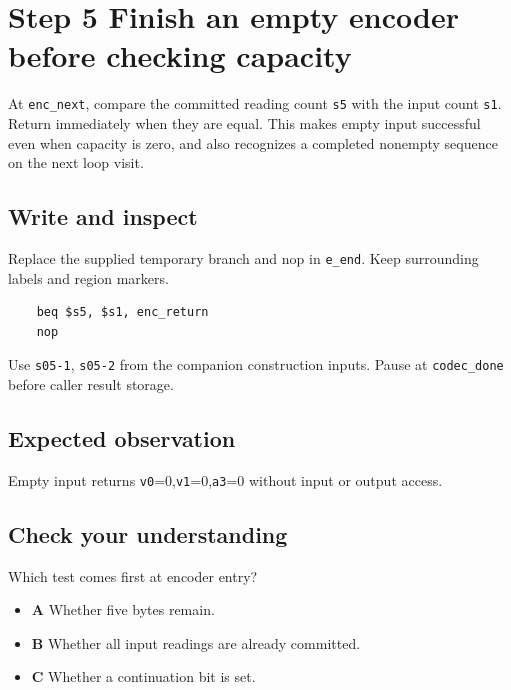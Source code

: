 \section{Step 5 Finish an empty encoder before checking capacity}\label{delta-s05}

At \texttt{enc\_next}, compare the committed reading count \texttt{s5} with the input count \texttt{s1}. Return immediately when they are equal. This makes empty input successful even when capacity is zero, and also recognizes a completed nonempty sequence on the next loop visit.

\subsection{Write and inspect}
Replace the supplied temporary branch and nop in \texttt{e\_end}. Keep surrounding labels and region markers.

\begin{verbatim}
    beq $s5, $s1, enc_return
    nop
\end{verbatim}
Use \texttt{s05-1}, \texttt{s05-2} from the companion construction inputs. Pause at \texttt{codec\_done} before caller result storage.

\subsection{Expected observation}
Empty input returns \texttt{v0}=0,\texttt{v1}=0,\texttt{a3}=0 without input or output access.

\subsection{Check your understanding}
Which test comes first at encoder entry?

\begin{itemize}
  \item \textbf{A} Whether five bytes remain.
  \item \textbf{B} Whether all input readings are already committed.
  \item \textbf{C} Whether a continuation bit is set.
\end{itemize}
